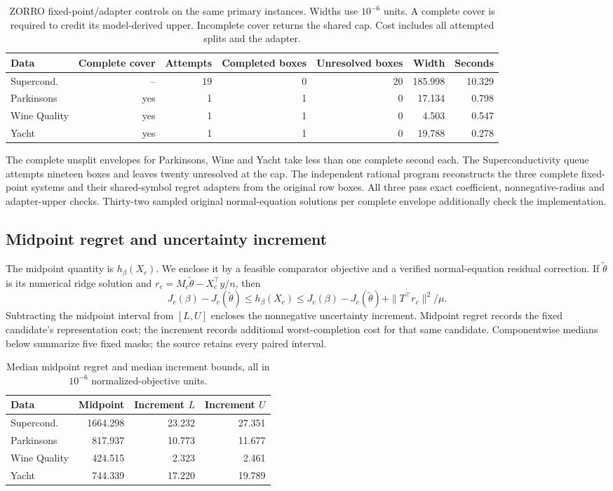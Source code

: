 \begin{table}[t]\centering\small
\caption{ZORRO fixed-point/adapter controls on the same primary instances. Widths use $10^{-6}$ units. A complete cover is required to credit its model-derived upper. Incomplete cover returns the shared cap. Cost includes all attempted splits and the adapter.}
\label{tab:zorro-v90}
\begin{tabular}{lrrrrrr}\toprule Data&Complete cover&Attempts&Completed boxes&Unresolved boxes&Width&Seconds\\\midrule
Supercond. & -- & 19 & 0 & 20 & 185.998 & 10.329\\
Parkinsons & yes & 1 & 1 & 0 & 17.134 & 0.798\\
Wine Quality & yes & 1 & 1 & 0 & 4.503 & 0.547\\
Yacht & yes & 1 & 1 & 0 & 19.788 & 0.278\\
\bottomrule\end{tabular}\end{table}
The complete unsplit envelopes for Parkinsons, Wine and Yacht take less than one complete second each. The Superconductivity queue attempts nineteen boxes and leaves twenty unresolved at the cap. The independent rational program reconstructs the three complete fixed-point systems and their shared-symbol regret adapters from the original row boxes. All three pass exact coefficient, nonnegative-radius and adapter-upper checks. Thirty-two sampled original normal-equation solutions per complete envelope additionally check the implementation.

\subsection{Midpoint regret and uncertainty increment}
The midpoint quantity is $h_\beta(X_c)$. We enclose it by a feasible comparator objective and a verified normal-equation residual correction. If $\widetilde\theta$ is its numerical ridge solution and $r_c=M_c\widetilde\theta-X_c^\top y/n$, then
\[
 J_c(\beta)-J_c(\widetilde\theta)\le h_\beta(X_c)
 \le J_c(\beta)-J_c(\widetilde\theta)+\|T^\top r_c\|^2/\mu.
\]
Subtracting the midpoint interval from $[L,U]$ encloses the nonnegative uncertainty increment. Midpoint regret records the fixed candidate's representation cost; the increment records additional worst-completion cost for that same candidate. Componentwise medians below summarize five fixed masks; the source retains every paired interval.
\begin{table}[t]\centering\small
\caption{Median midpoint regret and median increment bounds, all in $10^{-6}$ normalized-objective units.}
\label{tab:increments-v90}
\begin{tabular}{lrrr}\toprule Data&Midpoint&Increment $L$&Increment $U$\\\midrule
Supercond. & 1664.298 & 23.232 & 27.351\\
Parkinsons & 817.937 & 10.773 & 11.677\\
Wine Quality & 424.515 & 2.323 & 2.461\\
Yacht & 744.339 & 17.220 & 19.789\\
\bottomrule\end{tabular}\end{table}

